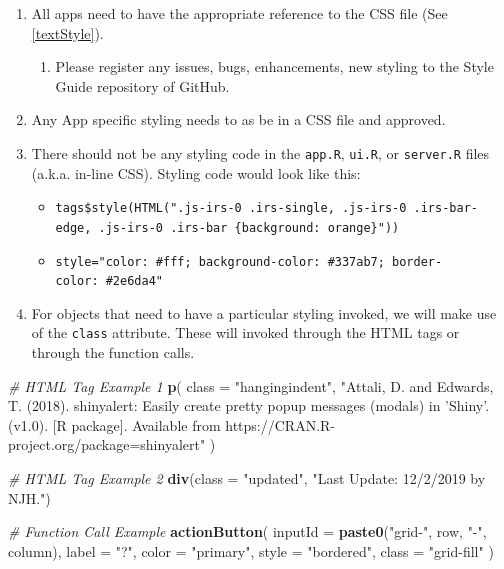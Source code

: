 \documentclass[
]{book}
\newenvironment{Shaded}{\begin{snugshade}}{\end{snugshade}}
\newcommand{\CommentTok}[1]{\textcolor[rgb]{0.56,0.35,0.01}{\textit{#1}}}
\newcommand{\DataTypeTok}[1]{\textcolor[rgb]{0.13,0.29,0.53}{#1}}
\newcommand{\KeywordTok}[1]{\textcolor[rgb]{0.13,0.29,0.53}{\textbf{#1}}}
\newcommand{\NormalTok}[1]{#1}
\newcommand{\StringTok}[1]{\textcolor[rgb]{0.31,0.60,0.02}{#1}}
\providecommand{\tightlist}{%
  \setlength{\itemsep}{0pt}\setlength{\parskip}{0pt}}
\begin{document}
\begin{enumerate}
\def\labelenumi{\arabic{enumi}.}
\tightlist
\item
  All apps need to have the appropriate reference to the CSS file (See \ref{textStyle}).

  \begin{enumerate}
  \def\labelenumii{\alph{enumii}.}
  \tightlist
  \item
    Please register any issues, bugs, enhancements, new styling to the Style Guide repository of GitHub.
  \end{enumerate}
\item
  Any App specific styling needs to as be in a CSS file and approved.
\item
  There should not be any styling code in the \texttt{app.R}, \texttt{ui.R}, or \texttt{server.R} files (a.k.a. in-line CSS). Styling code would look like this:

  \begin{itemize}
  \tightlist
  \item
    \texttt{tags\$style(HTML(".js-irs-0\ .irs-single,\ .js-irs-0\ .irs-bar-edge,\ .js-irs-0\ .irs-bar\ \{background:\ orange\}"))}~\\
  \item
    \texttt{style="color:\ \#fff;\ background-color:\ \#337ab7;\ border-color:\ \#2e6da4"}
  \end{itemize}
\item
  For objects that need to have a particular styling invoked, we will make use of the \texttt{class} attribute. These will invoked through the HTML tags or through the function calls.
\end{enumerate}

\begin{Shaded}
\begin{Highlighting}[]
\CommentTok{# HTML Tag Example 1}
\KeywordTok{p}\NormalTok{(}
  \DataTypeTok{class =} \StringTok{"hangingindent"}\NormalTok{,}
  \StringTok{"Attali, D. and Edwards, T. (2018). shinyalert: Easily create}
\StringTok{  pretty popup messages (modals) in 'Shiny'. (v1.0). [R package].}
\StringTok{  Available from https://CRAN.R-project.org/package=shinyalert"}
\NormalTok{)}

\CommentTok{# HTML Tag Example 2}
\KeywordTok{div}\NormalTok{(}\DataTypeTok{class =} \StringTok{"updated"}\NormalTok{, }\StringTok{"Last Update: 12/2/2019 by NJH."}\NormalTok{)}

\CommentTok{# Function Call Example}
\KeywordTok{actionButton}\NormalTok{(}
  \DataTypeTok{inputId =} \KeywordTok{paste0}\NormalTok{(}\StringTok{"grid-"}\NormalTok{, row, }\StringTok{"-"}\NormalTok{, column),}
  \DataTypeTok{label =} \StringTok{"?"}\NormalTok{,}
  \DataTypeTok{color =} \StringTok{"primary"}\NormalTok{,}
  \DataTypeTok{style =} \StringTok{"bordered"}\NormalTok{,}
  \DataTypeTok{class =} \StringTok{"grid-fill"}
\NormalTok{)}
\end{Highlighting}
\end{Shaded}
\end{document}
